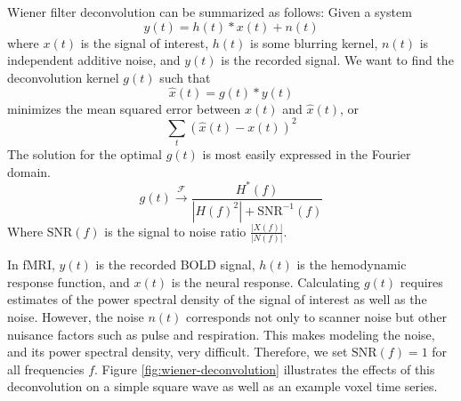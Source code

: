 \documentclass[preprint,5p,authoryear]{elsarticle}
\begin{document}
Wiener filter deconvolution can be summarized as follows:
Given a system
\begin{equation}
y(t) = h(t) \ast x(t) + n(t)
\end{equation}
where $x(t)$ is the signal of interest, $h(t)$ is some blurring kernel, $n(t)$ is independent additive noise, and $y(t)$ is the recorded signal.
We want to find the deconvolution kernel $g(t)$ such that 
\begin{equation}
\hat{x}(t) = g(t) \ast y(t)
\end{equation}
minimizes the mean squared error between $x(t)$ and $\hat{x}(t)$, or
\begin{equation}
\sum_{t}{\left( \hat{x}(t) - x(t) \right)^{2}}
\end{equation}
The solution for the optimal $g(t)$ is most easily expressed in the Fourier domain.
\begin{equation}
g(t) \xrightarrow{\mathcal{F}} \frac{H^{*}(f)}{\left|H(f)^{2}\right| + \mbox{SNR}^{-1}(f)}
\end{equation}
Where $\mbox{SNR}(f)$ is the signal to noise ratio $\frac{\left| X(f) \right|}{\left| N(f) \right|}$.

In fMRI, $y(t)$ is the recorded BOLD signal, $h(t)$ is the hemodynamic response function, and $x(t)$ is the neural response.
Calculating $g(t)$ requires estimates of the power spectral density of the signal of interest as well as the noise.
However, the noise $n(t)$ corresponds not only to scanner noise but other nuisance factors such as pulse and respiration.
This makes modeling the noise, and its power spectral density, very difficult.
Therefore, we set $\mbox{SNR}(f) = 1$ for all frequencies $f$.
Figure \ref{fig:wiener-deconvolution} illustrates the effects of this deconvolution on a simple square wave as well as an example voxel time series.
\end{document}
